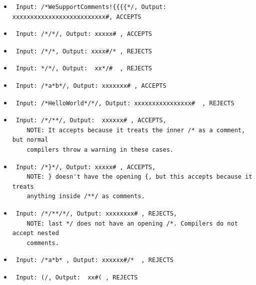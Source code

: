 \documentclass{article}
\begin{document}
\begin{itemize}
    \item \begin{verbatim} Input: /*WeSupportComments!{{{{*/, Output: xxxxxxxxxxxxxxxxxxxxxxxxxx#, ACCEPTS \end{verbatim}
    \item \begin{verbatim} Input: /*/*/, Output: xxxxx# , ACCEPTS \end{verbatim}  
    \item \begin{verbatim} Input: /*/*, Output: xxxx#/* , REJECTS \end{verbatim}
    \item \begin{verbatim} Input: */*/, Output:  xx*/#  , REJECTS \end{verbatim}
    \item \begin{verbatim} Input: /*a*b*/, Output: xxxxxxx# , ACCEPTS \end{verbatim}
    \item \begin{verbatim} Input: /*HelloWorld*/*/, Output: xxxxxxxxxxxxxxxx#  , REJECTS \end{verbatim}
    \item \begin{verbatim} Input: /*/**/, Output:  xxxxxx# , ACCEPTS, 
    NOTE: It accepts because it treats the inner /* as a comment, but normal 
    compilers throw a warning in these cases. \end{verbatim} 
    \item \begin{verbatim} Input: /*}*/, Output: xxxxx# , ACCEPTS, 
    NOTE: } doesn't have the opening {, but this accepts because it treats 
    anything inside /**/ as comments. \end{verbatim}
    \item \begin{verbatim} Input: /*/**/*/, Output: xxxxxxxx# , REJECTS, 
    NOTE: last */ does not have an opening /*. Compilers do not accept nested 
    comments. \end{verbatim}
    \item \begin{verbatim} Input: /*a*b* , Output: xxxxxx#/*  , REJECTS \end{verbatim}
    \item \begin{verbatim} Input: (/, Output:  xx#( , REJECTS \end{verbatim} 

\end{itemize}
\end{document}
